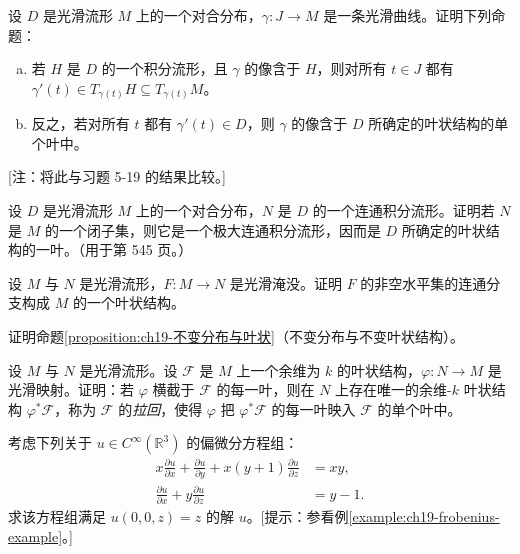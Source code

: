 \documentclass[../../main.tex]{subfiles}
\begin{document}
\begin{exercise}\label{exercise:ch19-06}
设 $D$ 是光滑流形 $M$ 上的一个对合分布，$\gamma\colon J\to M$ 是一条光滑曲线。证明下列命题：
\begin{enumerate}[(a)]
\item 若 $H$ 是 $D$ 的一个积分流形，且 $\gamma$ 的像含于 $H$，则对所有 $t\in J$ 都有 $\gamma'(t)\in T_{\gamma(t)}H\subseteq T_{\gamma(t)}M$。
\item 反之，若对所有 $t$ 都有 $\gamma'(t)\in D$，则 $\gamma$ 的像含于 $D$ 所确定的叶状结构的单个叶中。
\end{enumerate}
[注：将此与习题 5-19 的结果比较。]
\end{exercise}

\begin{exercise}\label{exercise:ch19-07}
设 $D$ 是光滑流形 $M$ 上的一个对合分布，$N$ 是 $D$ 的一个连通积分流形。证明若 $N$ 是 $M$ 的一个闭子集，则它是一个极大连通积分流形，因而是 $D$ 所确定的叶状结构的一叶。（用于第 545 页。）
\end{exercise}

\begin{exercise}\label{exercise:ch19-08}
设 $M$ 与 $N$ 是光滑流形，$F\colon M\to N$ 是光滑淹没。证明 $F$ 的非空水平集的连通分支构成 $M$ 的一个叶状结构。
\end{exercise}

\begin{exercise}\label{exercise:ch19-09}
证明命题\cref{proposition:ch19-不变分布与叶状}（不变分布与不变叶状结构）。
\end{exercise}

\begin{exercise}\label{exercise:ch19-10}
设 $M$ 与 $N$ 是光滑流形。设 $\mathscr F$ 是 $M$ 上一个余维为 $k$ 的叶状结构，$\varphi\colon N\to M$ 是光滑映射。证明：若 $\varphi$ 横截于 $\mathscr F$ 的每一叶，则在 $N$ 上存在唯一的余维-$k$ 叶状结构 $\varphi^*\mathscr F$，称为 $\mathscr F$ 的\emph{拉回}，使得 $\varphi$ 把 $\varphi^*\mathscr F$ 的每一叶映入 $\mathscr F$ 的单个叶中。
\end{exercise}

\begin{exercise}\label{exercise:ch19-11}
考虑下列关于 $u\in C^\infty(\mathbb{R}^3)$ 的偏微分方程组：
\begin{align*}
x\frac{\partial u}{\partial x}+\frac{\partial u}{\partial y}+x(y+1)\frac{\partial u}{\partial z}&=xy,\\
\frac{\partial u}{\partial x}+y\frac{\partial u}{\partial z}&=y-1.
\end{align*}
求该方程组满足 $u(0,0,z)=z$ 的解 $u$。[提示：参看例\cref{example:ch19-frobenius-example}。]
\end{exercise}
\end{document}
